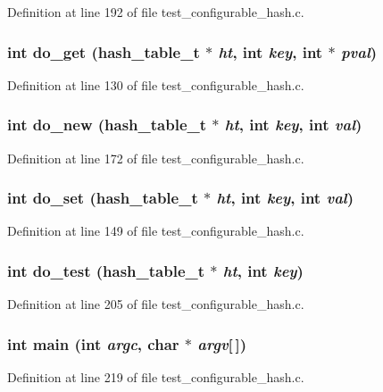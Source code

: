 Definition at line 192 of file test\_\-configurable\_\-hash.c.
\subsubsection[{do\_\-get}]{\setlength{\rightskip}{0pt plus 5cm}int do\_\-get (hash\_\-table\_\-t $\ast$ {\em ht}, \/  int {\em key}, \/  int $\ast$ {\em pval})}\label{test__configurable__hash_8c_a3bffceb3f720af7648080322f59db3a6}


Definition at line 130 of file test\_\-configurable\_\-hash.c.
\subsubsection[{do\_\-new}]{\setlength{\rightskip}{0pt plus 5cm}int do\_\-new (hash\_\-table\_\-t $\ast$ {\em ht}, \/  int {\em key}, \/  int {\em val})}\label{test__configurable__hash_8c_acf576a787ddf26b8190fa8dcf589ba81}


Definition at line 172 of file test\_\-configurable\_\-hash.c.
\subsubsection[{do\_\-set}]{\setlength{\rightskip}{0pt plus 5cm}int do\_\-set (hash\_\-table\_\-t $\ast$ {\em ht}, \/  int {\em key}, \/  int {\em val})}\label{test__configurable__hash_8c_a20e86e8b8ecadf6a9b33b9a17287699a}


Definition at line 149 of file test\_\-configurable\_\-hash.c.
\subsubsection[{do\_\-test}]{\setlength{\rightskip}{0pt plus 5cm}int do\_\-test (hash\_\-table\_\-t $\ast$ {\em ht}, \/  int {\em key})}\label{test__configurable__hash_8c_a9cdbf52d290b3c15a7498a6f6f5c76a1}


Definition at line 205 of file test\_\-configurable\_\-hash.c.
\subsubsection[{main}]{\setlength{\rightskip}{0pt plus 5cm}int main (int {\em argc}, \/  char $\ast$ {\em argv}[$\,$])}\label{test__configurable__hash_8c_a0ddf1224851353fc92bfbff6f499fa97}


Definition at line 219 of file test\_\-configurable\_\-hash.c.